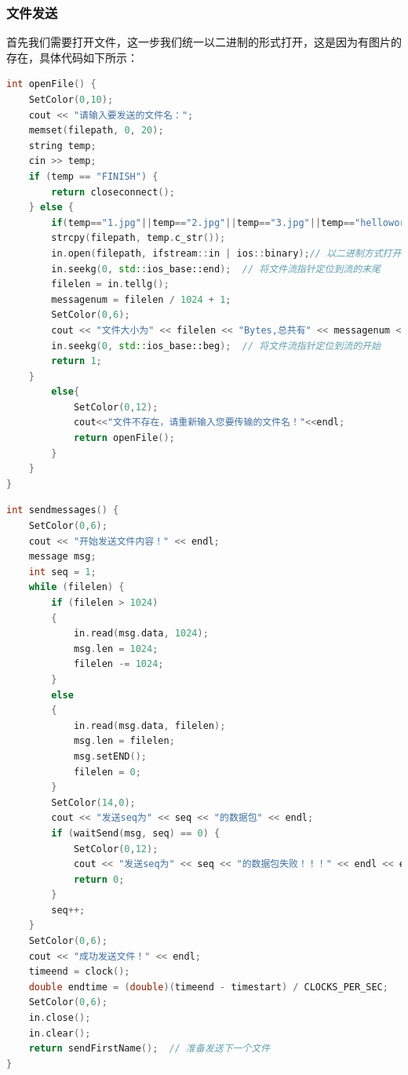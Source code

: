 \documentclass[UTF8,a4paper,10pt]{ctexart}
\begin{document}
\subsubsection{文件发送}
首先我们需要打开文件，这一步我们统一以二进制的形式打开，这是因为有图片的存在，具体代码如下所示：
\begin{lstlisting}[title=打开文件,frame=trbl,language={C++}]
int openFile() {
    SetColor(0,10);
    cout << "请输入要发送的文件名：";
    memset(filepath, 0, 20);
    string temp;
    cin >> temp;
    if (temp == "FINISH") {
        return closeconnect();
    } else {
        if(temp=="1.jpg"||temp=="2.jpg"||temp=="3.jpg"||temp=="helloworld.txt"){
        strcpy(filepath, temp.c_str());
        in.open(filepath, ifstream::in | ios::binary);// 以二进制方式打开文件
        in.seekg(0, std::ios_base::end);  // 将文件流指针定位到流的末尾
        filelen = in.tellg();
        messagenum = filelen / 1024 + 1;
        SetColor(0,6);
        cout << "文件大小为" << filelen << "Bytes,总共有" << messagenum << "个数据包" << endl;
        in.seekg(0, std::ios_base::beg);  // 将文件流指针定位到流的开始
        return 1;
    }
        else{
            SetColor(0,12);
            cout<<"文件不存在，请重新输入您要传输的文件名！"<<endl;
            return openFile();
        }
    }
}
\end{lstlisting}
\begin{lstlisting}[title=客户端发送文件,frame=trbl,language={C++}]
int sendmessages() {
    SetColor(0,6);
    cout << "开始发送文件内容！" << endl;
    message msg;
    int seq = 1;
    while (filelen) {
        if (filelen > 1024)
        {
            in.read(msg.data, 1024);
            msg.len = 1024;
            filelen -= 1024;
        }
        else
        {
            in.read(msg.data, filelen);
            msg.len = filelen;
            msg.setEND();
            filelen = 0;
        }
        SetColor(14,0);
        cout << "发送seq为" << seq << "的数据包" << endl;
        if (waitSend(msg, seq) == 0) {
            SetColor(0,12);
            cout << "发送seq为" << seq << "的数据包失败！！！" << endl << endl;
            return 0;
        }
        seq++;
    }
    SetColor(0,6);
    cout << "成功发送文件！" << endl;
    timeend = clock();
    double endtime = (double)(timeend - timestart) / CLOCKS_PER_SEC;
    SetColor(0,6);
    in.close();
    in.clear();
    return sendFirstName();  // 准备发送下一个文件
}
\end{lstlisting}
\end{document}
